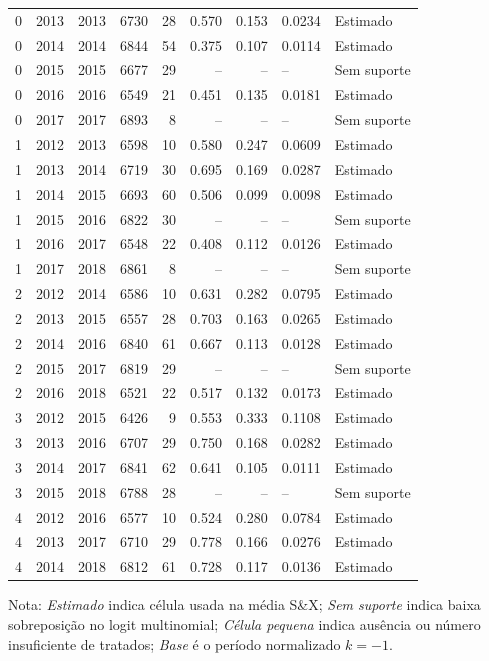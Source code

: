 \begin{longtable}{rrrrrrrll}
0 & 2013 & 2013 & 6730 & 28 & 0.570 & 0.153 & 0.0234 & Estimado \\
0 & 2014 & 2014 & 6844 & 54 & 0.375 & 0.107 & 0.0114 & Estimado \\
0 & 2015 & 2015 & 6677 & 29 & -- & -- & -- & Sem suporte \\
0 & 2016 & 2016 & 6549 & 21 & 0.451 & 0.135 & 0.0181 & Estimado \\
0 & 2017 & 2017 & 6893 & 8 & -- & -- & -- & Sem suporte \\
1 & 2012 & 2013 & 6598 & 10 & 0.580 & 0.247 & 0.0609 & Estimado \\
1 & 2013 & 2014 & 6719 & 30 & 0.695 & 0.169 & 0.0287 & Estimado \\
1 & 2014 & 2015 & 6693 & 60 & 0.506 & 0.099 & 0.0098 & Estimado \\
1 & 2015 & 2016 & 6822 & 30 & -- & -- & -- & Sem suporte \\
1 & 2016 & 2017 & 6548 & 22 & 0.408 & 0.112 & 0.0126 & Estimado \\
1 & 2017 & 2018 & 6861 & 8 & -- & -- & -- & Sem suporte \\
2 & 2012 & 2014 & 6586 & 10 & 0.631 & 0.282 & 0.0795 & Estimado \\
2 & 2013 & 2015 & 6557 & 28 & 0.703 & 0.163 & 0.0265 & Estimado \\
2 & 2014 & 2016 & 6840 & 61 & 0.667 & 0.113 & 0.0128 & Estimado \\
2 & 2015 & 2017 & 6819 & 29 & -- & -- & -- & Sem suporte \\
2 & 2016 & 2018 & 6521 & 22 & 0.517 & 0.132 & 0.0173 & Estimado \\
3 & 2012 & 2015 & 6426 & 9 & 0.553 & 0.333 & 0.1108 & Estimado \\
3 & 2013 & 2016 & 6707 & 29 & 0.750 & 0.168 & 0.0282 & Estimado \\
3 & 2014 & 2017 & 6841 & 62 & 0.641 & 0.105 & 0.0111 & Estimado \\
3 & 2015 & 2018 & 6788 & 28 & -- & -- & -- & Sem suporte \\
4 & 2012 & 2016 & 6577 & 10 & 0.524 & 0.280 & 0.0784 & Estimado \\
4 & 2013 & 2017 & 6710 & 29 & 0.778 & 0.166 & 0.0276 & Estimado \\
4 & 2014 & 2018 & 6812 & 61 & 0.728 & 0.117 & 0.0136 & Estimado \\
\end{longtable}
\vspace{-0.35cm}
\noindent\footnotesize Nota: \textit{Estimado} indica célula usada na média S\&X; \textit{Sem suporte} indica baixa sobreposição no logit multinomial; \textit{Célula pequena} indica ausência ou número insuficiente de tratados; \textit{Base} é o período normalizado \(k=-1\).
\par\endgroup

